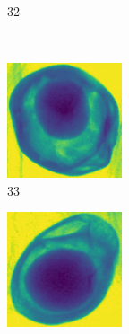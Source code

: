 \documentclass[11pt]{article}
\begin{document}
\begin{figure}[!h]
\begin{subfigure}[b]{0.22\textwidth}
         \caption{32}
         \label{fig:avo_31}
     \end{subfigure}
               \\
    \begin{subfigure}[b]{0.22\textwidth}
         \centering
         \includegraphics[width=\textwidth]{figurer/avocado_dataset/avo_32.jpg}
         \caption{33}
         \label{fig:avo_32}
     \end{subfigure}
     \hfill
     \begin{subfigure}[b]{0.22\textwidth}
         \centering
         \includegraphics[width=\textwidth]{figurer/avocado_dataset/avo_33.jpg}

\end{subfigure}
\end{figure}
\end{document}
